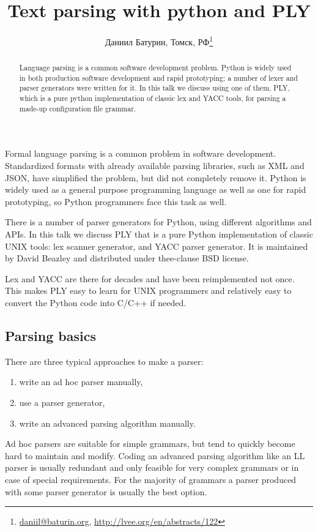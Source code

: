 \documentclass[10pt, a5paper]{article}
\begin{document}
\title{Text parsing with python and PLY}
\author{Даниил Батурин, Томск, РФ\footnote{\url{daniil@baturin.org}, \url{http://lvee.org/en/abstracts/122}}}
\maketitle
\begin{abstract}
Language parsing is a common software development problem. Python is widely used in both production software development and rapid prototyping; a number of lexer and parser generators were written for it.
In this talk we discuss using one of them, PLY, which is a pure python implementation of classic lex and YACC tools, for parsing a made-up configuration file grammar.
\end{abstract}
Formal language parsing is a common problem in software development. Standardized formats with already available parsing libraries, such as XML and JSON, have simplified the problem, but did not completely remove it. Python is widely used as a general purpose programming language as well as one for rapid prototyping, so Python programmers face this task as well.

There is a number of parser generators for Python, using different algorithms and APIs. In this talk we discuss PLY that is a pure Python implementation of classic UNIX tools: lex scanner generator, and YACC parser generator. It is maintained by David Beazley and distributed under thee-clause BSD license.

Lex and YACC are there for decades and have been reimplemented not once. This makes PLY easy to learn for UNIX programmers and relatively easy to convert the Python code into C/C++ if needed.

\subsection*{Parsing basics}

There are three typical approaches to make a parser:

\begin{enumerate}
  \item write an ad hoc parser manually,
  \item use a parser generator,
  \item write an advanced parsing algorithm manually.
\end{enumerate}

Ad hoc parsers are suitable for simple grammars, but tend to quickly become hard to maintain and modify. Coding an advanced parsing algorithm like an LL parser is usually redundant and only feasible for very complex grammars or in case of special requirements. For the majority of grammars a parser produced with some parser generator is usually the best option.
\end{document}
